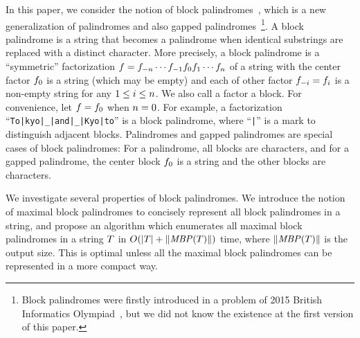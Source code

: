 In this paper, we consider the notion of block palindromes~\cite{BIO2015}, which is
a new generalization of palindromes and also gapped palindromes~\footnote{Block palindromes were firstly introduced in a problem of 2015 British Informatics Olympiad~\cite{BIO2015}, but we did not know the existence at the first version of this paper.}.
A block palindrome is a string that becomes a palindrome when identical substrings are replaced with a distinct character.
More precisely, a block palindrome is a ``symmetric'' factorization $f=f_{-n} \cdots f_{-1} f_0 f_1 \cdots f_n$ of a string with the center factor $f_0$ is a string (which may be empty) and each of other factor $f_{-i}=f_{i}$ is a non-empty string for any $1 \le i \le n$.
We also call a factor a block.
For convenience, let $f=f_0$ when $n=0$.
For example, a factorization ``\texttt{To|kyo|_|and|_|Kyo|to}'' is a block palindrome, where ``\texttt{|}'' is a mark to distinguish adjacent blocks.
Palindromes and gapped palindromes are special cases of block palindromes:
For a palindrome, all blocks are characters, and for a gapped palindrome, the center block $f_0$ is a string and the other blocks are characters.

We investigate several properties of block palindromes.
We introduce the notion of maximal block palindromes to concisely represent all block palindromes in a string,
and propose an algorithm which enumerates all maximal block palindromes in a string $T$ in $O(|T| + \|\mathit{MBP}(T)\|)$ time, where $\|\mathit{MBP}(T)\|$ is the output size. This is optimal unless all the maximal block palindromes can be represented in a more compact way.
